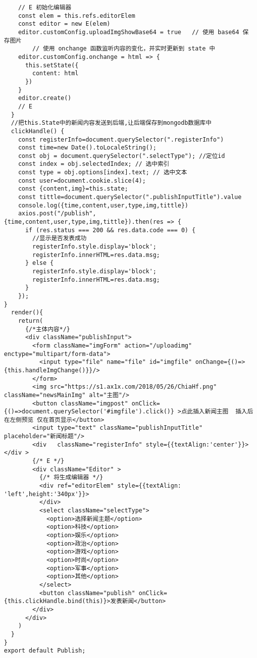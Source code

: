 \documentclass[]{article}
\begin{document}
\begin{verbatim}
    // E 初始化编辑器
    const elem = this.refs.editorElem
    const editor = new E(elem)
    editor.customConfig.uploadImgShowBase64 = true   // 使用 base64 保存图片
		// 使用 onchange 函数监听内容的变化，并实时更新到 state 中
    editor.customConfig.onchange = html => {
      this.setState({
        content: html
      })
    }
    editor.create()
    // E
  }
  //把this.State中的新闻内容发送到后端,让后端保存到mongodb数据库中
  clickHandle() {
    const registerInfo=document.querySelector(".registerInfo")
    const time=new Date().toLocaleString();
    const obj = document.querySelector(".selectType"); //定位id
    const index = obj.selectedIndex; // 选中索引
    const type = obj.options[index].text; // 选中文本
    const user=document.cookie.slice(4);
    const {content,img}=this.state;
    const tittle=document.querySelector(".publishInputTitle").value
    console.log({time,content,user,type,img,tittle})
    axios.post("/publish", {time,content,user,type,img,tittle}).then(res => {
      if (res.status === 200 && res.data.code === 0) {
        //显示是否发表成功
        registerInfo.style.display='block';
        registerInfo.innerHTML=res.data.msg;
      } else {
        registerInfo.style.display='block';
        registerInfo.innerHTML=res.data.msg;
      }
    });
}
  render(){
    return(
      {/*主体内容*/}
      <div className="publishInput"> 
        <form className="imgForm" action="/uploadimg" enctype="multipart/form-data">
          <input type="file" name="file" id="imgfile" onChange={()=>{this.handleImgChange()}}/>
        </form>
        <img src="https://s1.ax1x.com/2018/05/26/ChiaHf.png" className="newsMainImg" alt="主图"/>
        <button className="imgpost" onClick={()=>document.querySelector('#imgfile').click()} >点此插入新闻主图  插入后在左侧预览 仅在首页显示</button>
        <input type="text" className="publishInputTitle" placeholder="新闻标题"/>
        <div   className="registerInfo" style={{textAlign:'center'}}></div >
        {/* E */}
        <div className="Editor" >
          {/* 将生成编辑器 */}
          <div ref="editorElem" style={{textAlign: 'left',height:'340px'}}>
          </div>
          <select className="selectType">
            <option>选择新闻主题</option>
            <option>科技</option>
            <option>娱乐</option>
            <option>政治</option>
            <option>游戏</option>            
            <option>时尚</option>
            <option>军事</option>
            <option>其他</option>
          </select>
          <button className="publish" onClick={this.clickHandle.bind(this)}>发表新闻</button>
        </div> 
      </div>
    )
  }
}
export default Publish;
\end{verbatim}
\end{document}
